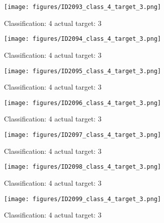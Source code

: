\begin{figure}[h!]
\begin{center}
\texttt{[image: figures/ID2093\_class\_4\_target\_3.png]}
\end{center}
\caption{ Classification: 4 actual target: 3}
\label{fig:ID2093_class_4_target_3}
\end{figure}
\begin{figure}[h!]
\begin{center}
\texttt{[image: figures/ID2094\_class\_4\_target\_3.png]}
\end{center}
\caption{ Classification: 4 actual target: 3}
\label{fig:ID2094_class_4_target_3}
\end{figure}
\begin{figure}[h!]
\begin{center}
\texttt{[image: figures/ID2095\_class\_4\_target\_3.png]}
\end{center}
\caption{ Classification: 4 actual target: 3}
\label{fig:ID2095_class_4_target_3}
\end{figure}
\begin{figure}[h!]
\begin{center}
\texttt{[image: figures/ID2096\_class\_4\_target\_3.png]}
\end{center}
\caption{ Classification: 4 actual target: 3}
\label{fig:ID2096_class_4_target_3}
\end{figure}
\begin{figure}[h!]
\begin{center}
\texttt{[image: figures/ID2097\_class\_4\_target\_3.png]}
\end{center}
\caption{ Classification: 4 actual target: 3}
\label{fig:ID2097_class_4_target_3}
\end{figure}
\begin{figure}[h!]
\begin{center}
\texttt{[image: figures/ID2098\_class\_4\_target\_3.png]}
\end{center}
\caption{ Classification: 4 actual target: 3}
\label{fig:ID2098_class_4_target_3}
\end{figure}
\begin{figure}[h!]
\begin{center}
\texttt{[image: figures/ID2099\_class\_4\_target\_3.png]}
\end{center}
\caption{ Classification: 4 actual target: 3}
\label{fig:ID2099_class_4_target_3}
\end{figure}
